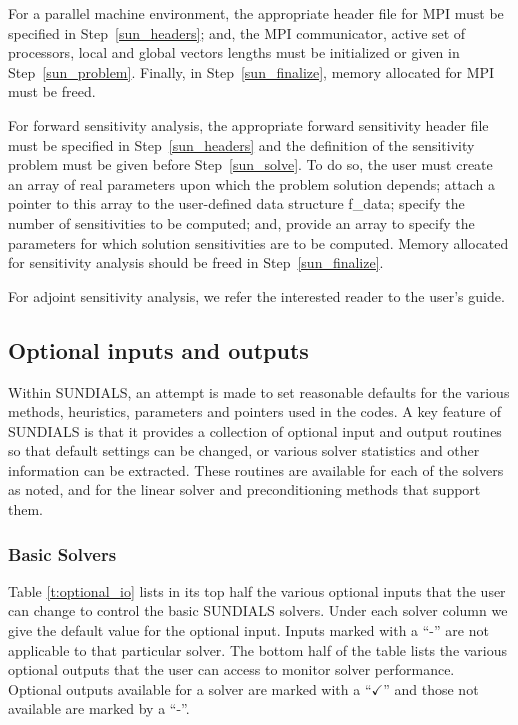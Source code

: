 For a parallel machine environment, the appropriate header file for
MPI must be specified in Step~\ref{sun_headers}; and, the MPI communicator,
active set of processors, local and global vectors lengths must be
initialized or given in Step~\ref{sun_problem}. Finally, in
Step~\ref{sun_finalize}, memory allocated for MPI must be freed.

For forward sensitivity analysis, the appropriate forward sensitivity
header file must be specified in Step~\ref{sun_headers} and the
definition of the sensitivity problem must be given before
Step~\ref{sun_solve}. To do so, the user must create an array of
real parameters upon which the problem solution depends; attach a pointer to
this array to the user-defined data structure f\_data; specify the
number of sensitivities to be computed; and, provide an array to
specify the parameters for which solution sensitivities are to be
computed. Memory allocated for sensitivity analysis should be freed in
Step~\ref{sun_finalize}.

{\sf For adjoint sensitivity analysis, we refer the interested reader to
the user's guide.}

\subsection{Optional inputs and outputs}\label{ss:optional_io}

Within SUNDIALS, an attempt is made to set reasonable defaults for the
various methods, heuristics, parameters and pointers used in the
codes. 
A key feature of SUNDIALS is that it provides a collection of optional
input and output routines so that default settings can be changed, or
various solver statistics and other information can be extracted.
These routines are available for each of the solvers as noted, and for
the linear solver and preconditioning methods that support them.

\subsubsection*{Basic Solvers} 
Table \ref{t:optional_io} lists in its top half the various optional 
inputs that the user can change to control the basic SUNDIALS solvers.
Under each solver column we give the default value for the optional 
input. Inputs marked with a ``-'' are not applicable to that particular 
solver. The bottom half of the table lists the various optional 
outputs that the user can access to monitor solver performance.
Optional outputs available for a solver are marked with a ``$\checkmark$''
and those not available are marked by a ``-''.

